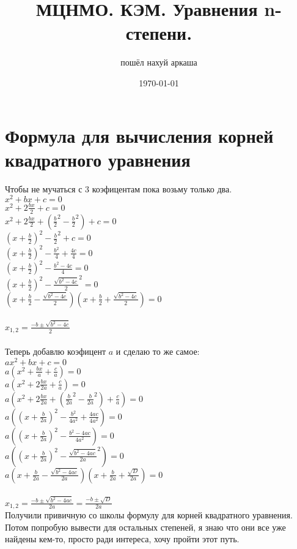 \documentclass{article} %
\title{МЦНМО. КЭМ. Уравнения n-степени.}
\author{пошёл нахуй аркаша}
\date{\today}
\begin{document}
	
	\maketitle
	\newpage
	
	\section{Формула для вычисления корней квадратного уравнения}{
		Чтобы не мучаться с $3$ коэфицентам пока возьму только два.\\
		$x^2+bx+c=0$\\
		$x^2+2\frac{bx}{2}+c=0$\\
		$x^2+2\frac{bx}{2}+(\frac{b}{2}^2-\frac{b}{2}^2)+c=0$\\
		$(x+\frac{b}{2})^2-\frac{b}{2}^2+c=0$\\
		$(x+\frac{b}{2})^2-\frac{b^2}{4}+\frac{4c}{4}=0$\\
		$(x+\frac{b}{2})^2-\frac{b^2-4c}{4}=0$\\
		$(x+\frac{b}{2})^2-\frac{\sqrt{b^2-4c}}{2}^2=0$\\
		$(x+\frac{b}{2}-\frac{\sqrt{b^2-4c}}{2})(x+\frac{b}{2}+\frac{\sqrt{b^2-4c}}{2})=0$\\\\
		$x_{1,2} = \frac{-b\pm\sqrt{b^2-4c}}{2}$\\\\
		Теперь добавлю коэфицент $a$ и сделаю то же самое:\\
		$ax^2+bx+c=0$\\
		$a(x^2+\frac{bx}{a}+\frac{c}{a})=0$\\
		$a(x^2+2\frac{bx}{2a}+\frac{c}{a})=0$\\
		$a(x^2+2\frac{bx}{2a}+(\frac{b}{2a}^2 - \frac{b}{2a}^2)+\frac{c}{a})=0$\\
		$a((x+\frac{b}{2a})^2 - \frac{b^2}{4a^2} + \frac{4ac}{4a^2})=0$\\
		$a((x+\frac{b}{2a})^2 - \frac{b^2-4ac}{4a^2})=0$\\
		$a((x+\frac{b}{2a})^2 - \frac{\sqrt{b^2-4ac}}{2a}^2)=0$\\
		$a(x+\frac{b}{2a} - \frac{\sqrt{b^2-4ac}}{2a})(x+\frac{b}{2a} + \frac{\sqrt{D}}{2a})=0$\\\\
		$x_{1,2} = \frac{-b\pm\sqrt{b^2-4ac}}{2a} = \frac{-b\pm\sqrt{D}}{2a}$\\
		Получили привичную со школы формулу для корней квадратного уравнения. Потом попробую вывести для остальных степеней, я знаю что они все уже найдены кем-то, просто ради интереса, хочу пройти этот путь.
	}
\end{document}
